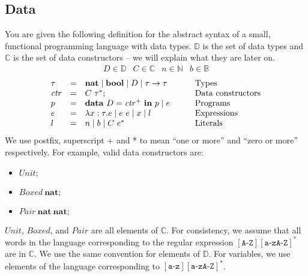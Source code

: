 \documentclass[10pt,a4paper]{exam} %
\begin{document}
\begin{questions}

\section*{Data}
\question You are given the following definition for the abstract syntax of a small, functional programming language with data types. $\mathbb{D}$ is the set of data types and $\mathbb{C}$ is the set of data constructors -- we will explain what they are later on.
\begin{displaymath}
\begin{array}{cccc}
D \in \mathbb{D} &
C \in \mathbb{C} &
n \in \mathbb{N} &
b \in \mathbb{B} 
\end{array}
\end{displaymath}
\begin{displaymath}
\begin{array}{lcll}
\tau & = & \mathbf{nat} \mid \mathbf{bool} \mid D \mid \tau \to \tau & \qquad \text{\color{black}Types}\\
\mathit{ctr} & = & C~\tau^*; & \qquad \text{\color{black}Data constructors}\\
p & = & \mathbf{data}~D = \mathit{ctr}^+~\mathbf{in}~p \mid e & \qquad \text{\color{black}Programs}\\
e & = & \lambda x : \tau.e \mid e~e \mid x \mid l & \qquad \text{\color{black}Expressions} \\
l & = & n \mid b \mid C~e^* & \qquad \text{\color{black}Literals}
\end{array}
\end{displaymath}
We use postfix, superscript + and * to mean ``one or more'' and ``zero or more'' respectively. For example, valid data constructors are:
\begin{itemize}
    \item $\mathit{Unit};$
    \item $\mathit{Boxed}~\mathbf{nat};$
    \item $\mathit{Pair}~\mathbf{nat}~\mathbf{nat};$
\end{itemize}
$\mathit{Unit}$, $\mathit{Boxed}$, and $\mathit{Pair}$ are all elements of $\mathbb{C}$. For consistency, we assume that all words in the language corresponding to the regular expression $[\texttt{A-Z}][\texttt{a-zA-Z}]^*$ are in $\mathbb{C}$. We use the same convention for elements of $\mathbb{D}$. For variables, we use elements of the language corresponding to $[\texttt{a-z}][\texttt{a-zA-Z}]^*$.


\end{questions}
\end{document}

